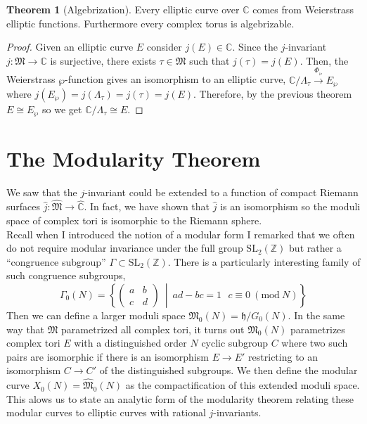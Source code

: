 \documentclass{article}
\newcommand{\SL}[0]{\mathrm{SL}}
\newcommand{\Z}{\mathbb{Z}}
\newcommand{\C}{\mathbb{C}}
\theoremstyle{definition}
\newtheorem{theorem}{Theorem}[section]
\renewcommand{\mod}[3]{\: #1 \equiv #2 \: (\text{mod} \: #3)}
\newcommand{\h}{\mathfrak{h}}
\newcommand{\MG}{\SL_2(\Z)}
\begin{document}
{\begin{theorem}[Algebrization]
Every elliptic curve over $\C$ comes from Weierstrass elliptic functions. Furthermore every complex torus is algebrizable.  
\end{theorem}

\begin{proof}
Given an elliptic curve $E$ consider $j(E) \in \C$. Since the $j$-invariant $j : \mathfrak{M} \to \C$ is surjective, there exists $\tau \in \mathfrak{M}$ such that $j(\tau) = j(E)$. Then, the Weierstrass $\wp$-function gives an isomorphism to an elliptic curve, $\C / \Lambda_{\tau} \xrightarrow{\Phi_\wp} E_\wp$ where $j(E_\wp) = j(\Lambda_{\tau}) = j(\tau) = j(E)$. Therefore, by the previous theorem $E \cong E_\wp$ so we get $\C / \Lambda_\tau \cong E$.
\end{proof}


\section{The Modularity Theorem}


We saw that the $j$-invariant could be extended to a function of compact Riemann surfaces $\hat{j} : \hat{\mathfrak{M}} \to \hat{\C}$. In fact, we have shown that $\hat{j}$ is an isomorphism so the moduli space of complex tori is isomorphic to the Riemann sphere. 
\bigskip\\
Recall when I introduced the notion of a modular form  I remarked that we often do not require modular invariance under the full group $\MG$ but rather a ``congruence subgroup'' $\Gamma \subset \MG$. There is a particularly interesting family of such congruence subgroups,
\[ \Gamma_0(N) = \left \{ 
\begin{pmatrix} a & b 
\\
c & d
\end{pmatrix} 
\: \middle| \: a d - b c = 1 \: \: \mod{c}{0}{N}  
\right \} \]
Then we can define a larger moduli space $\mathfrak{M}_0(N) = \h / G_0(N)$. In the same way that $\mathfrak{M}$ parametrized all complex tori, it turns out $\mathfrak{M}_0(N)$ parametrizes complex tori $E$ with a distinguished order $N$ cyclic subgroup $C$ where two such pairs are isomorphic if there is an isomorphism $E \to E'$ restricting to an isomorphism $C \to C'$ of the distinguished subgroups. We then define the modular curve $X_0(N) = \hat{\mathfrak{M}}_0(N)$ as the compactification of this extended moduli space. This alows us to state an analytic form of the modularity theorem relating these modular curves to elliptic curves with rational $j$-invariants.

}
\end{document}
